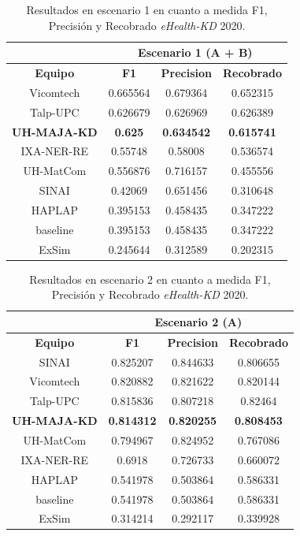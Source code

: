 \begin{table}[tb!]\centering
	\begin{tabular}{|c|c|c|c|}
		\hline
		&  \multicolumn{3}{c|}{\textbf{Escenario 1 (A + B)}} \\
		\hline
		\textbf{Equipo} & \textbf{F1} & \textbf{Precision} & \textbf{Recobrado} \\
		\hline
		Vicomtech & 0.665564 & 0.679364 & 0.652315  \\
		Talp-UPC & 0.626679 & 0.626969 & 0.626389 \\
		\textbf{UH-MAJA-KD} & \textbf{0.625} & \textbf{0.634542} & \textbf{0.615741} \\
		IXA-NER-RE & 0.55748 & 0.58008 & 0.536574 \\
		UH-MatCom & 0.556876 & 0.716157 & 0.455556 \\
		SINAI & 0.42069 & 0.651456 & 0.310648 \\
		HAPLAP & 0.395153 & 0.458435 & 0.347222 \\
		baseline & 0.395153 & 0.458435 & 0.347222 \\
		ExSim & 0.245644 & 0.312589 & 0.202315 \\	
		\hline
	\end{tabular}
	\caption{Resultados en escenario 1 en cuanto a medida F1, Precisi\'on y Recobrado \textit{eHealth-KD} 2020. \label{table:results_20_escenario1}}
\end{table}


\begin{table}[tb!]\centering
	\begin{tabular}{|c|c|c|c|}
		\hline
		&  \multicolumn{3}{c|}{\textbf{Escenario 2 (A)}} \\
		\hline
		\textbf{Equipo} & \textbf{F1} & \textbf{Precision} & \textbf{Recobrado} \\
		\hline
		SINAI & 0.825207 & 0.844633 & 0.806655 \\
		Vicomtech & 0.820882 & 0.821622 & 0.820144 \\
		Talp-UPC & 0.815836 & 0.807218 & 0.82464 \\
		\textbf{UH-MAJA-KD} & \textbf{0.814312} & \textbf{0.820255} & \textbf{0.808453} \\
		UH-MatCom & 0.794967 & 0.824952 & 0.767086 \\
		IXA-NER-RE & 0.6918 & 0.726733 & 0.660072 \\
		HAPLAP & 0.541978 & 0.503864 & 0.586331 \\
		baseline & 0.541978 & 0.503864 & 0.586331 \\
		ExSim & 0.314214 & 0.292117 & 0.339928 \\	
		\hline
	\end{tabular}
	\caption{Resultados en escenario 2 en cuanto a medida F1, Precisi\'on y Recobrado \textit{eHealth-KD} 2020. \label{table:results_20_escenario2}}
\end{table}

